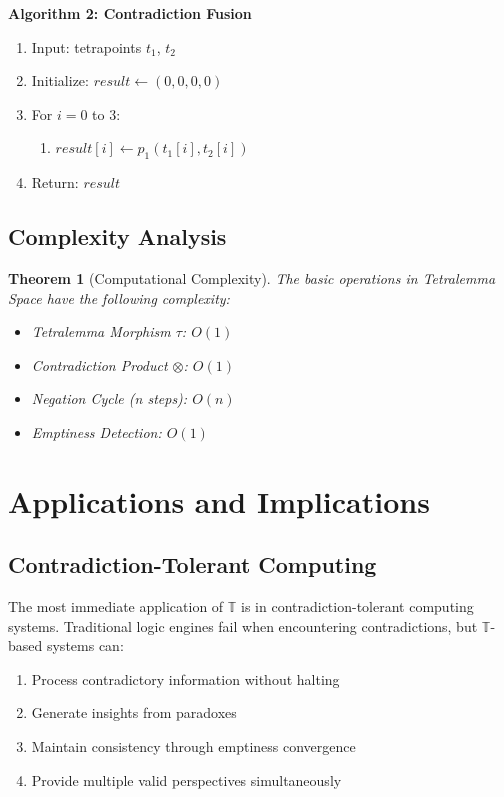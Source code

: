 \documentclass[11pt,a4paper]{article}
\newtheorem{theorem}{Theorem}
\begin{document}
\textbf{Algorithm 2: Contradiction Fusion}
\begin{enumerate}
\item Input: tetrapoints $t_1$, $t_2$
\item Initialize: $result \leftarrow (0, 0, 0, 0)$
\item For $i = 0$ to $3$:
    \begin{enumerate}
    \item $result[i] \leftarrow p_1(t_1[i], t_2[i])$
    \end{enumerate}
\item Return: $result$
\end{enumerate}

\subsection{Complexity Analysis}

\begin{theorem}[Computational Complexity]
The basic operations in Tetralemma Space have the following complexity:
\begin{itemize}
    \item Tetralemma Morphism $\tau$: $O(1)$
    \item Contradiction Product $\otimes$: $O(1)$
    \item Negation Cycle (n steps): $O(n)$
    \item Emptiness Detection: $O(1)$
\end{itemize}
\end{theorem}

\section{Applications and Implications}

\subsection{Contradiction-Tolerant Computing}

The most immediate application of $\mathbb{T}$ is in contradiction-tolerant computing systems. Traditional logic engines fail when encountering contradictions, but $\mathbb{T}$-based systems can:

\begin{enumerate}
    \item Process contradictory information without halting
    \item Generate insights from paradoxes
    \item Maintain consistency through emptiness convergence
    \item Provide multiple valid perspectives simultaneously
\end{enumerate}
\end{document}
